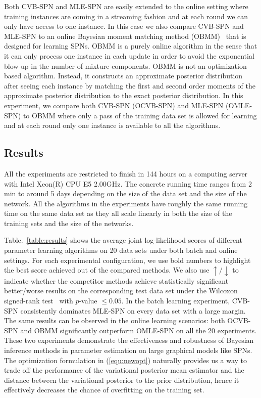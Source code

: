 \documentclass{article} %
\theoremstyle{definition}
\begin{document}
Both CVB-SPN and MLE-SPN are easily extended to the online setting where training instances are coming in a streaming fashion and at each round we can only have access to one instance. In this case we also compare CVB-SPN and MLE-SPN to an online Bayesian moment matching method (OBMM)~\cite{rashwan2016bmm} that is designed for learning SPNs. OBMM is a purely online algorithm in the sense that it can only process one instance in each update in order to avoid the exponential blow-up in the number of mixture components. OBMM is not an optimization-based algorithm. Instead, it constructs an approximate posterior distribution after seeing each instance by matching the first and second order moments of the approximate posterior distribution to the exact posterior distribution. In this experiment, we compare both CVB-SPN (OCVB-SPN) and MLE-SPN (OMLE-SPN) to OBMM where only a pass of the training data set is allowed for learning and at each round only one instance is available to all the algorithms. 

\subsection{Results}
All the experiments are restricted to finish in 144 hours on a computing server with Intel Xeon(R) CPU E5 2.00GHz. The concrete running time ranges from 2 min to around 5 days depending on the size of the data set and the size of the network. All the algorithms in the experiments have roughly the same running time on the same data set as they all scale linearly in both the size of the training sets and the size of the networks. 

Table.~\ref{table:results} shows the average joint log-likelihood scores of different parameter learning algorithms on 20 data sets under both batch and online settings. For each experimental configuration, we use bold numbers to highlight the best score achieved out of the compared methods. We also use $\uparrow/\downarrow$ to indicate whether the competitor methods achieve statistically significant better/worse results on the corresponding test data set under the Wilcoxon signed-rank test~\cite{wilcoxon1964some} with $p$-value $\leq 0.05$. In the batch learning experiment, CVB-SPN consistently dominates MLE-SPN on every data set with a large margin. The same results can be observed in the online learning scenarios: both OCVB-SPN and OBMM significantly outperform OMLE-SPN on all the 20 experiments. These two experiments demonstrate the effectiveness and robustness of Bayesian inference methods in parameter estimation on large graphical models like SPNs. The optimization formulation in (\ref{equ:newopt}) naturally provides us a way to trade off the performance of the variational posterior mean estimator and the  distance between the variational posterior to the prior distribution, hence it effectively decreases the chance of overfitting on the training set. 
\end{document}
